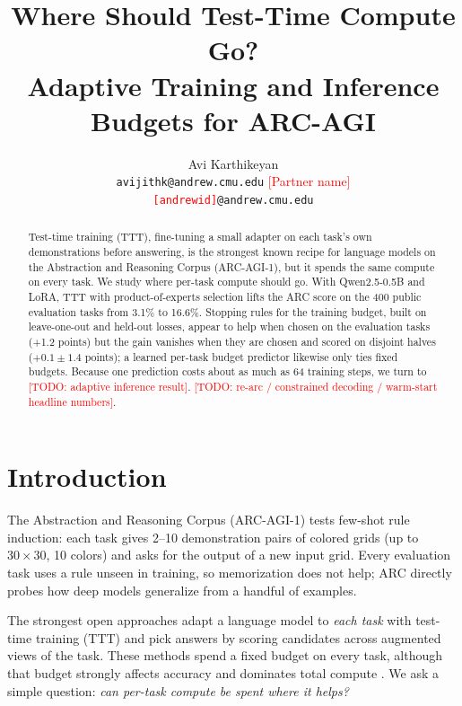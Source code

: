 \documentclass{article}
\title{Where Should Test-Time Compute Go?\\Adaptive Training and Inference Budgets for ARC-AGI}
\author{%
  Avi Karthikeyan \\ \texttt{avijithk@andrew.cmu.edu} \And
  \textcolor{red}{[Partner name]} \\ \texttt{\textcolor{red}{[andrewid]}@andrew.cmu.edu}
}
\newcommand{\todo}[1]{\textcolor{red}{[TODO: #1]}}
\begin{document}
\maketitle

\begin{abstract}
Test-time training (TTT), fine-tuning a small adapter on each task's own demonstrations before answering, is the strongest known recipe for language models on the Abstraction and Reasoning Corpus (ARC-AGI-1), but it spends the same compute on every task. We study where per-task compute should go. With Qwen2.5-0.5B and LoRA, TTT with product-of-experts selection lifts the ARC score on the 400 public evaluation tasks from 3.1\% to 16.6\%. Stopping rules for the training budget, built on leave-one-out and held-out losses, appear to help when chosen on the evaluation tasks (+1.2 points) but the gain vanishes when they are chosen and scored on disjoint halves ($+0.1 \pm 1.4$ points); a learned per-task budget predictor likewise only ties fixed budgets. Because one prediction costs about as much as 64 training steps, we turn to \todo{adaptive inference result}. \todo{re-arc / constrained decoding / warm-start headline numbers}.
\end{abstract}

\section{Introduction}

The Abstraction and Reasoning Corpus (ARC-AGI-1) \cite{chollet2019measure} tests few-shot rule induction: each task gives 2--10 demonstration pairs of colored grids (up to $30\times30$, 10 colors) and asks for the output of a new input grid. Every evaluation task uses a rule unseen in training, so memorization does not help; ARC directly probes how deep models generalize from a handful of examples.

The strongest open approaches \cite{akyurek2024surprising,franzen2025product} adapt a language model to \emph{each task} with test-time training (TTT) and pick answers by scoring candidates across augmented views of the task. These methods spend a fixed budget on every task, although that budget strongly affects accuracy and dominates total compute \cite{deliege2026trainingbudgets}. We ask a simple question: \emph{can per-task compute be spent where it helps?}
\end{document}
